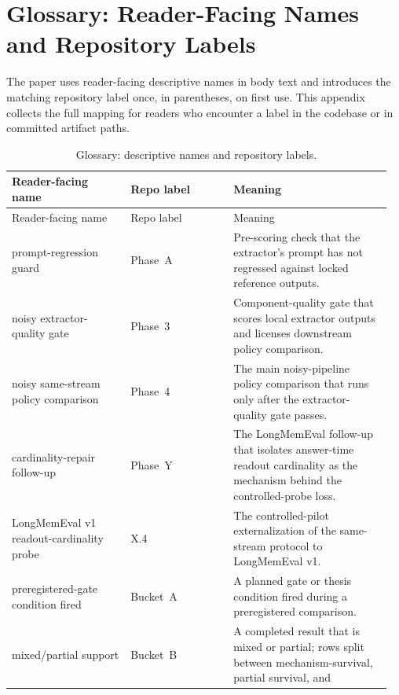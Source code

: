 \section{Glossary: Reader-Facing Names and Repository Labels}
\label{app:glossary}

The paper uses reader-facing descriptive names in body text and introduces the
matching repository label once, in parentheses, on first use. This appendix
collects the full mapping for readers who encounter a label in the codebase or
in committed artifact paths.

{\small
\setlength{\LTpre}{6pt}
\setlength{\LTpost}{6pt}
\setlength{\tabcolsep}{4pt}
\begin{longtable}{@{}>{\raggedright\arraybackslash}p{0.30\linewidth} >{\raggedright\arraybackslash}p{0.26\linewidth} >{\raggedright\arraybackslash}p{0.40\linewidth}@{}}
\caption[Glossary: descriptive names and repository labels.]{Glossary:
descriptive names and repository labels.}\label{tab:glossary}\\
\toprule
Reader-facing name & Repo label & Meaning \\
\midrule
\endfirsthead
\toprule
Reader-facing name & Repo label & Meaning \\
\midrule
\endhead
prompt-regression guard & Phase~A & Pre-scoring check that the extractor's
  prompt has not regressed against locked reference outputs. \\
\addlinespace
noisy extractor-quality gate & Phase~3 & Component-quality gate that scores
  local extractor outputs and licenses downstream policy comparison. \\
\addlinespace
noisy same-stream policy comparison & Phase~4 & The main noisy-pipeline
  policy comparison that runs only after the extractor-quality gate passes. \\
\addlinespace
cardinality-repair follow-up & Phase~Y & The LongMemEval follow-up that
  isolates answer-time readout cardinality as the mechanism behind the
  controlled-probe loss. \\
\addlinespace
LongMemEval v1 readout-cardinality probe & X.4 & The controlled-pilot
  externalization of the same-stream protocol to LongMemEval v1. \\
\addlinespace
preregistered-gate condition fired & Bucket~A & A planned gate or thesis
  condition fired during a preregistered comparison. \\
\addlinespace
mixed/partial support & Bucket~B & A completed result that is mixed or
  partial; rows split between mechanism-survival, partial survival, and

\end{longtable}}
